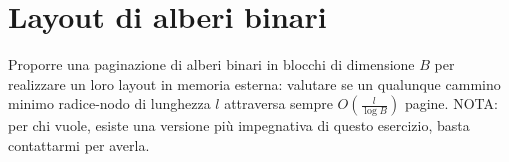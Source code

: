 \chapter{Layout di alberi binari}

\begin{problem*}
    Proporre una paginazione di alberi binari in blocchi di dimensione \(B\) per
    realizzare un loro layout in memoria esterna: valutare se un qualunque cammino
    minimo radice-nodo di lunghezza \(l\) attraversa sempre \(O(\frac{l}{\log{B}})\)
    pagine. NOTA: per chi vuole, esiste una versione pi\`u impegnativa di questo
    esercizio, basta contattarmi per averla.
\end{problem*}


